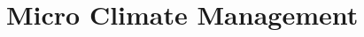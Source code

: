 \documentclass[../main]{subfiles}
\begin{document}
\chapter{Micro Climate Management} \label{chp:}
\end{document}
